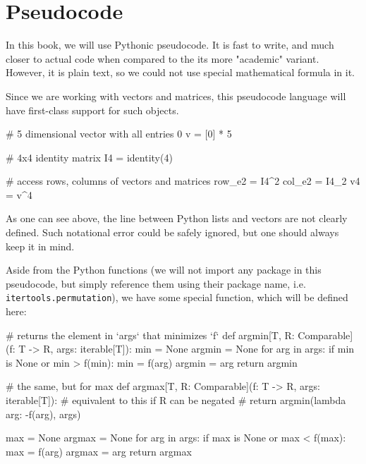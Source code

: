 \section{Pseudocode} %
\label{sec:Pseudocode}

In this book, we will use Pythonic pseudocode. It is fast to write, and much
closer to actual code when compared to the its more "academic" variant. However,
it is plain text, so we could not use special mathematical formula in it.

Since we are working with vectors and matrices, this pseudocode language will
have first-class support for such objects.
\begin{python}
# 5 dimensional vector with all entries 0
v = [0] * 5

# 4x4 identity matrix
I4 = identity(4)

# access rows, columns of vectors and matrices
row_e2 = I4^2
col_e2 = I4_2
v4 = v^4
\end{python}

As one can see above, the line between Python lists and vectors are not clearly
defined. Such notational error could be safely ignored, but one should always
keep it in mind.

Aside from the Python functions (we will not import any package in this
pseudocode, but simply reference them using their package name, i.e.
\verb|itertools.permutation|), we have some special function, which will be
defined here:

\begin{python}
# returns the element in `args` that minimizes `f`
def argmin[T, R: Comparable](f: T -> R, args: iterable[T]):
  min = None
  argmin = None
  for arg in args:
    if min is None or min > f(min):
      min = f(arg)
      argmin = arg
  return argmin

# the same, but for max
def argmax[T, R: Comparable](f: T -> R, args: iterable[T]):
  # equivalent to this if R can be negated
  # return argmin(lambda arg: -f(arg), args)

  max = None
  argmax = None
  for arg in args:
    if max is None or max < f(max):
      max = f(arg)
      argmax = arg
  return argmax
\end{python}


